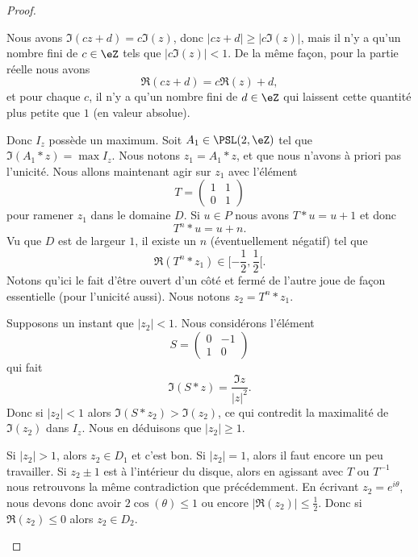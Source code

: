 \begin{proof}
\begin{subproof}
		Nous avons \( \Im(cz+d)=c\Im(z)\), donc \( | cz+d |\geq |c \Im(z) |\), mais il n'y a qu'un nombre fini de \( c\in \eZ\) tels que \( | c\Im(z) |<1\). De la même façon, pour la partie réelle nous avons
		\begin{equation}
			\Re(cz+d)=c\Re(z)+d,
		\end{equation}
		et pour chaque \( c\),  il n'y a qu'un nombre fini de \( d\in \eZ\) qui laissent cette quantité plus petite que \( 1\) (en valeur absolue).

		Donc \( I_z\) possède un maximum. Soit \( A_1\in\PSL(2,\eZ)\) tel que \( \Im(A_1*z)=\max I_z\). Nous notons \( z_1=A_1*z\), et que nous n'avons à priori pas l'unicité. Nous allons maintenant agir sur \( z_1\) avec l'élément
		\begin{equation}
			T=\begin{pmatrix}
				1 & 1 \\
				0 & 1
			\end{pmatrix}
		\end{equation}
		pour ramener \( z_1\) dans le domaine \( D\). Si \( u\in P\) nous avons \( T*u=u+1\) et donc
		\begin{equation}
			T^n*u=u+n.
		\end{equation}
		Vu que \( D\) est de largeur \( 1\), il existe un \( n\) (éventuellement négatif) tel que
		\begin{equation}
			\Re(T^n*z_1)\in\mathopen[ -\frac{ 1 }{2} , \frac{ 1 }{2} [.
		\end{equation}
		Notons qu'ici le fait d'être ouvert d'un côté et fermé de l'autre joue de façon essentielle (pour l'unicité aussi). Nous notons \( z_2=T^n*z_1\).

		Supposons un instant que \( | z_2 |<1\). Nous considérons l'élément
		\begin{equation}
			S=\begin{pmatrix}
				0 & -1 \\
				1 & 0
			\end{pmatrix}
		\end{equation}
		qui fait
		\begin{equation}
			\Im(S*z)=\frac{ \Im z }{| z |^2}.
		\end{equation}
		Donc si \( | z_2 |<1\) alors \( \Im(S*z_2)>\Im(z_2)\), ce qui contredit la maximalité de \( \Im(z_2)\) dans \( I_z\). Nous en déduisons que \( | z_2 |\geq 1\).

		Si \( | z_2 |>1\), alors \( z_2\in D_1\) et c'est bon. Si \( | z_2 |=1\), alors il faut encore un peu travailler. Si \( z_2\pm 1\) est à l'intérieur du disque, alors en agissant avec \( T\) ou \( T^{-1}\) nous retrouvons la même contradiction que précédemment. En écrivant \( z_2= e^{i\theta}\), nous devons donc avoir \( 2\cos(\theta)\leq 1\) ou encore \( |\Re(z_2)|\leq \frac{ 1 }{2}\). Donc si \( \Re(z_2)\leq 0\) alors \( z_2\in D_2\).


\end{subproof}
\end{proof}
